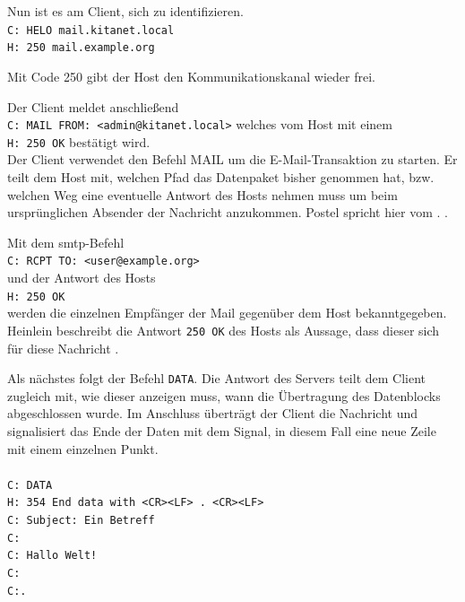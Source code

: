 Nun ist es am Client, sich zu identifizieren. \\
\verb+C: HELO mail.kitanet.local+ \\ 
\verb+H: 250 mail.example.org+

Mit Code 250  \citep[][38]{rfc821} gibt der Host den Kommunikationskanal wieder frei.

Der Client meldet anschließend \\
\verb+C: MAIL FROM: <admin@kitanet.local>+ welches vom Host mit einem \\
\verb+H: 250 OK+ bestätigt wird.\\
Der Client verwendet den Befehl MAIL um die E-Mail-Transaktion zu starten. Er teilt dem Host mit, welchen Pfad das Datenpaket bisher genommen hat, bzw. welchen Weg eine eventuelle Antwort des Hosts nehmen muss um beim ursprünglichen Absender der Nachricht anzukommen. Postel spricht hier vom .  \citep[vgl.][20]{rfc821}.

Mit dem \ac{smtp}-Befehl\\
\verb+C: RCPT TO: <user@example.org>+ \\ 
und der Antwort des Hosts \\
\verb+H: 250 OK+\\
werden die einzelnen Empfänger der Mail gegenüber dem Host bekanntgegeben. Heinlein beschreibt die Antwort \verb+250 OK+ des Hosts als Aussage, dass dieser sich für diese Nachricht  \citep[vgl.][25]{Heinlein2004}.

Als nächstes folgt der Befehl \verb+DATA+. Die Antwort des Servers teilt dem Client zugleich mit, wie dieser anzeigen muss, wann die Übertragung des Datenblocks abgeschlossen wurde. Im Anschluss überträgt der Client die Nachricht und signalisiert das Ende der Daten mit dem Signal, in diesem Fall eine neue Zeile mit einem einzelnen Punkt.\\
\\
\verb+C: DATA+ \\
\verb+H: 354 End data with <CR><LF> . <CR><LF>+\\
\verb+C: Subject: Ein Betreff+ \\
\verb+C:+\\
\verb+C: Hallo Welt!+ \\
\verb+C:+\\ 
\verb+C:.+

